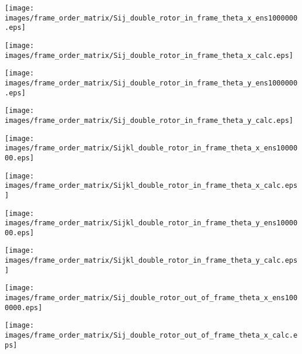 \documentclass[a4paper,11pt,twoside,openright]{book}
\def\lthtmlcheckvsize{\ifdim\ht\sizebox<\vsize 
  \ifdim\wd\sizebox<\hsize\expandafter\hfill\fi \expandafter\vfill
  \else\expandafter\vss\fi}%
\begin{document}
{\newpage\clearpage
{}%
\texttt{[image: images/frame\_order\_matrix/Sij\_double\_rotor\_in\_frame\_theta\_x\_ens1000000.eps]}%
\lthtmlpictureZ
\lthtmlcheckvsize\clearpage}

{\newpage\clearpage
{}%
\texttt{[image: images/frame\_order\_matrix/Sij\_double\_rotor\_in\_frame\_theta\_x\_calc.eps]}%
\lthtmlpictureZ
\lthtmlcheckvsize\clearpage}

{\newpage\clearpage
{}%
\texttt{[image: images/frame\_order\_matrix/Sij\_double\_rotor\_in\_frame\_theta\_y\_ens1000000.eps]}%
\lthtmlpictureZ
\lthtmlcheckvsize\clearpage}

{\newpage\clearpage
{}%
\texttt{[image: images/frame\_order\_matrix/Sij\_double\_rotor\_in\_frame\_theta\_y\_calc.eps]}%
\lthtmlpictureZ
\lthtmlcheckvsize\clearpage}

{\newpage\clearpage
{}%
\texttt{[image: images/frame\_order\_matrix/Sijkl\_double\_rotor\_in\_frame\_theta\_x\_ens1000000.eps]}%
\lthtmlpictureZ
\lthtmlcheckvsize\clearpage}

{\newpage\clearpage
{}%
\texttt{[image: images/frame\_order\_matrix/Sijkl\_double\_rotor\_in\_frame\_theta\_x\_calc.eps]}%
\lthtmlpictureZ
\lthtmlcheckvsize\clearpage}

{\newpage\clearpage
{}%
\texttt{[image: images/frame\_order\_matrix/Sijkl\_double\_rotor\_in\_frame\_theta\_y\_ens1000000.eps]}%
\lthtmlpictureZ
\lthtmlcheckvsize\clearpage}

{\newpage\clearpage
{}%
\texttt{[image: images/frame\_order\_matrix/Sijkl\_double\_rotor\_in\_frame\_theta\_y\_calc.eps]}%
\lthtmlpictureZ
\lthtmlcheckvsize\clearpage}

{\newpage\clearpage
{}%
\texttt{[image: images/frame\_order\_matrix/Sij\_double\_rotor\_out\_of\_frame\_theta\_x\_ens1000000.eps]}%
\lthtmlpictureZ
\lthtmlcheckvsize\clearpage}

{\newpage\clearpage
{}%
\texttt{[image: images/frame\_order\_matrix/Sij\_double\_rotor\_out\_of\_frame\_theta\_x\_calc.eps]}%
\lthtmlpictureZ
\lthtmlcheckvsize\clearpage}
\end{document}
